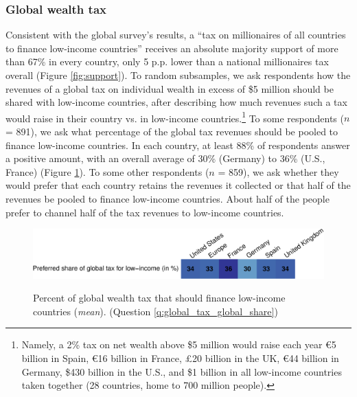 \subsubsection{Global wealth tax} 
Consistent with the global survey's results, a ``tax on millionaires of all countries to finance low-income countries'' receives an absolute majority support of more than 67\% in every country, only 5 p.p. lower than a national millionaires tax overall (Figure \ref{fig:support}). %
To random subsamples, we ask respondents how the revenues of a global tax on individual wealth in excess of \$5 million should be shared with low-income countries, after describing how much revenues such a tax would raise in their country vs. in low-income countries.\footnote{Namely, a 2\% tax on net wealth above \$5 million would raise each year \euro{}5 billion in Spain, \euro{}16 billion in France, £20 billion in the UK, \euro{}44 billion in Germany, \$430 billion in the U.S., and \$1 billion in all low-income countries taken together (28 countries, home to 700 million people).} To some respondents ($n$ = 891), we ask what percentage of the global tax revenues should be pooled to finance low-income countries. In each country, at least 88\% of respondents answer a positive amount, with an overall average of 30\% (Germany) to 36\% (U.S., France) (Figure \ref{fig:global_share_mean}). To some other respondents ($n$ = 859), we ask whether they would prefer that each country retains the revenues it collected or that half of the revenues be pooled to finance low-income countries. About half of the people prefer to channel half of the tax revenues to low-income countries. 

\begin{figure}
    \centering 
    \caption[Preferred share of wealth tax for low-income countries]{Percent of global wealth tax that should finance low-income countries (\textit{mean}). (Question \ref{q:global_tax_global_share})} %
    \includegraphics[width=1\textwidth]{../figures/country_comparison/global_tax_global_share_mean.pdf} \label{fig:global_share_mean}
\end{figure}

